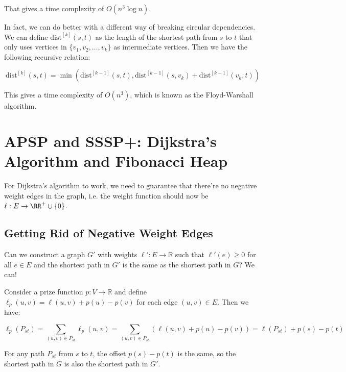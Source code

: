 That gives a time complexity of $O(n^3 \log n)$.

In fact, we can do better with a different way of breaking circular dependencies. We can define $\text{dist}^{[k]}(s, t)$ as the length of the shortest path from $s$ to $t$ that only uses vertices in $\{v_1,v_2,\ldots,v_k\}$ as intermediate vertices. Then we have the following recursive relation:

\[ \text{dist}^{[k]}(s, t) = \min\left( \text{dist}^{[k-1]}(s, t), \text{dist}^{[k-1]}(s, v_k) + \text{dist}^{[k-1]}(v_k, t) \right) \]

This gives a time complexity of $O(n^3)$, which is known as the Floyd-Warshall algorithm.

\section{APSP and SSSP+: Dijkstra's Algorithm and Fibonacci Heap}

For Dijkstra's algorithm to work, we need to guarantee that there're no negative weight edges in the graph, i.e. the weight function should now be $\ell: E \to \RR^+ \cup \{0\}$.

\subsection{Getting Rid of Negative Weight Edges} \label{section:get-rid-negative-weight-edges}

Can we construct a graph $G'$ with weights $\ell': E \to \mathbb{R}$ such that $\ell'(e) \geq 0$ for all $e \in E$ and the shortest path in $G'$ is the same as the shortest path in $G$? We can!

Consider a prize function $p: V \to \mathbb{R}$ and define $\ell_p(u, v) = \ell(u, v) + p(u) - p(v)$ for each edge $(u, v) \in E$. Then we have:

\[ \ell_p(P_{st}) = \sum_{(u, v) \in P_{st}} \ell_p(u, v) = \sum_{(u, v) \in P_{st}} (\ell(u, v) + p(u) - p(v)) = \ell(P_{st}) + p(s) - p(t) \]

For any path $P_{st}$ from $s$ to $t$, the offset $p(s) - p(t)$ is the same, so the shortest path in $G$ is also the shortest path in $G'$.
